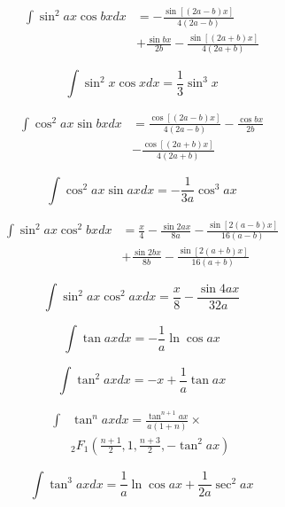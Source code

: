 \documentclass[../main.tex]{subfiles}
\begin{document}
    \begin{align*}
    \int \sin^2 ax \cos bx dx &= 
    -\frac{\sin[(2a-b)x]}{4(2a-b)} \nonumber \\ & 
    + \frac{\sin bx}{2b} 
    - \frac{\sin[(2a+b)x]}{4(2a+b)}
    \end{align*}
    
    \begin{equation*}
    \int \sin^2 x \cos x dx = \frac{1}{3} \sin^3 x
    \end{equation*}
    
    \begin{align*}
    \int \cos^2 ax \sin bx dx &= \frac{\cos[(2a-b)x]}{4(2a-b)} 
    - \frac{\cos bx}{2b}
    \nonumber \\ &
     - \frac{\cos[(2a+b)x]}{4(2a+b)}
    \end{align*}
    
    \begin{equation*}
    \int \cos^2 ax \sin ax dx = -\frac{1}{3a}\cos^3{ax} 
    \end{equation*}
    
    \begin{align*}
    \int \sin^2 ax \cos^2 bx dx &= \frac{x}{4}
    -\frac{\sin 2ax}{8a}-
    \frac{\sin[2(a-b)x]}{16(a-b)}
    \nonumber \\ &
    +\frac{\sin 2bx}{8b}-
    \frac{\sin[2(a+b)x]}{16(a+b)}
    \end{align*}
    
    \begin{equation*}
    \int \sin^2 ax \cos^2 ax dx = \frac{x}{8}-\frac{\sin 4ax}{32a}
    \end{equation*}
    
    \begin{equation*}
    \int \tan ax dx = -\frac{1}{a} \ln \cos ax 
    \end{equation*}
    
    \begin{equation*}
    \int \tan^2 ax dx = -x + \frac{1}{a} \tan ax 
    \end{equation*}
    
    \begin{align*}
    \int &\tan^n ax dx = 
    \frac{\tan^{n+1} ax }{a(1+n)} \times \nonumber \\ &
     {_2}F_1\left( \frac{n+1}{2}, 
    1, \frac{n+3}{2}, -\tan^2 ax \right) 
    \end{align*}
    
    \begin{equation*}
    \int \tan^3 ax dx = \frac{1}{a} \ln \cos ax + \frac{1}{2a}\sec^2 ax 
    \end{equation*}
    
\end{document}
